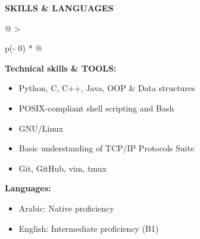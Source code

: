 \documentclass[a4paper]{article}
\begin{document}
\textbf{SKILLS \& LANGUAGES}
\vspace{-8pt}
\nopagebreak[4]
\begin{longtable}[]{@{}
  >{\raggedright\arraybackslash}p{(\columnwidth - 0\tabcolsep) * }@{}}
\toprule\noalign{}
\endhead
\endlastfoot
\vspace{0pt}
\begin{minipage}[t]{\linewidth}\raggedright
\textbf{Technical skills \& TOOLS:}

\begin{itemize}
\item
  Python, C, C++, Java, OOP \& Data structures
\item
  POSIX-compliant shell scripting and Bash
\item
  GNU/Linux
\item
  Basic understanding of TCP/IP Protocols Suite
\item
  Git, GitHub, vim, tmux
\end{itemize}

\textbf{Languages:}

\begin{itemize}
\item
  Arabic: Native proficiency
\item
  English: Intermediate proficiency (B1)
\end{itemize}
\end{minipage} \\
\end{longtable}
\vspace{-10pt}
\end{document}

